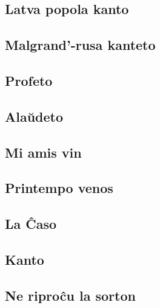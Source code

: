 \documentclass[a5paper,11pt,openany,twoside,leqno]{book}
\begin{document}
\subsection{Latva popola kanto}
\label{latva}


\subsection{Malgrand'-rusa kanteto}
\label{malgrand}


\subsection{Profeto} %
\label{profeto}


\subsection{Ala\u udeto}
\label{alauxdeto}


\vspace*{-5ex} %

\subsection{Mi amis vin}
\label{miamasvin}

\subsection{Printempo venos}
\label{printempovenos}


\subsection{La \^Caso}
\label{cxaso}


\subsection{Kanto}
\label{kanto}

\subsection{Ne ripro\^cu la sorton}
\label{riprocxu}

\end{document}
